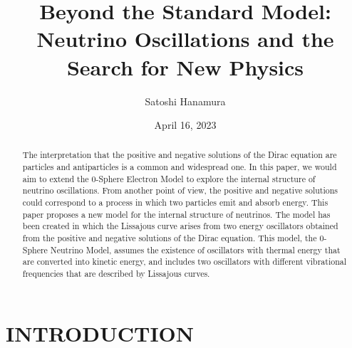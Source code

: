 \documentclass[%
 reprint,
 amsmath,amssymb,
 aps,
]{revtex4-1}
\numberwithin{equation}{section}%
\begin{document}

    \title{Beyond the Standard Model:\\
    Neutrino Oscillations and the Search for New Physics}
    \author{Satoshi Hanamura}
    \date{April 16, 2023}
        \begin{abstract}


 The interpretation that the positive and negative solutions of the Dirac equation are particles and antiparticles is a common and widespread one. In this paper, we would aim to extend the 0-Sphere Electron Model to explore the internal structure of neutrino oscillations. From another point of view, the positive and negative solutions could correspond to a process in which two particles emit and absorb energy. This paper proposes a new model for the internal structure of neutrinos. The model has been created in which the Lissajous curve arises from two energy oscillators obtained from the positive and negative solutions of the Dirac equation. This model, the 0-Sphere Neutrino Model, assumes the existence of oscillators with thermal energy that are converted into kinetic energy, and includes two oscillators with different vibrational frequencies that are described by Lissajous curves. 

        \end{abstract}
    \maketitle


\section{\label{sec:INTRODUCTION}INTRODUCTION}
\end{document}
